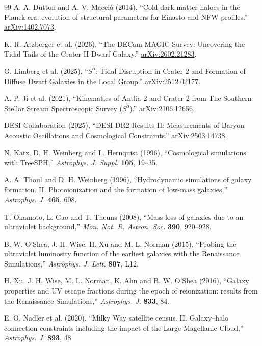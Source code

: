\begin{thebibliography}{99}
 A. A. Dutton and A. V. Macci\`o (2014),
``Cold dark matter haloes in the Planck era: evolution of structural
parameters for Einasto and NFW profiles.''
\href{https://arxiv.org/abs/1402.7073}{arXiv:1402.7073}.

 K. R. Atzberger et al. (2026),
``The DECam MAGIC Survey: Uncovering the Tidal Tails of the Crater II
Dwarf Galaxy.''
\href{https://arxiv.org/abs/2602.21283}{arXiv:2602.21283}.

 G. Limberg et al. (2025),
``$S^5$: Tidal Disruption in Crater 2 and Formation of Diffuse Dwarf
Galaxies in the Local Group.''
\href{https://arxiv.org/abs/2512.02177}{arXiv:2512.02177}.

 A. P. Ji et al. (2021),
``Kinematics of Antlia 2 and Crater 2 from The Southern Stellar Stream
Spectroscopic Survey ($S^5$).''
\href{https://arxiv.org/abs/2106.12656}{arXiv:2106.12656}.

 DESI Collaboration (2025),
``DESI DR2 Results II: Measurements of Baryon Acoustic Oscillations and
Cosmological Constraints.''
\href{https://arxiv.org/abs/2503.14738}{arXiv:2503.14738}.

 N. Katz, D. H. Weinberg and L. Hernquist (1996),
``Cosmological simulations with TreeSPH,''
\emph{Astrophys. J. Suppl.} \textbf{105}, 19--35.

 A. A. Thoul and D. H. Weinberg (1996),
``Hydrodynamic simulations of galaxy formation. II. Photoionization and
the formation of low-mass galaxies,'' \emph{Astrophys. J.} \textbf{465}, 608.

 T. Okamoto, L. Gao and T. Theuns (2008),
``Mass loss of galaxies due to an ultraviolet background,''
\emph{Mon. Not. R. Astron. Soc.} \textbf{390}, 920--928.

 B. W. O'Shea, J. H. Wise, H. Xu and M. L. Norman (2015),
``Probing the ultraviolet luminosity function of the earliest galaxies with the Renaissance Simulations,''
\emph{Astrophys. J. Lett.} \textbf{807}, L12.

 H. Xu, J. H. Wise, M. L. Norman, K. Ahn and B. W. O'Shea (2016),
``Galaxy properties and UV escape fractions during the epoch of reionization: results from the Renaissance Simulations,''
\emph{Astrophys. J.} \textbf{833}, 84.

 E. O. Nadler et al. (2020),
``Milky Way satellite census. II. Galaxy--halo connection constraints including the impact of the Large Magellanic Cloud,''
\emph{Astrophys. J.} \textbf{893}, 48.


\end{thebibliography}
